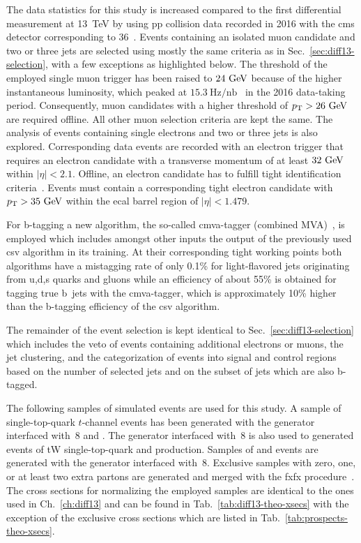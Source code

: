 The data statistics for this study is increased compared to the first differential measurement at 13~TeV by using \gls{pp} collision data recorded in 2016 with the \gls{cms} detector corresponding to 36~\invfb. Events containing an isolated muon candidate and two or three jets are selected using mostly the same criteria as in Sec.~\ref{sec:diff13-selection}, with a few exceptions as highlighted below. The threshold of the employed single muon trigger has been raised to $24~\textrm{GeV}$ because of the higher instantaneous luminosity, which peaked at $15.3~\mathrm{Hz}/\mathrm{nb}$~\cite{lumipublic} in the 2016 data-taking period. Consequently, muon candidates with a higher threshold of $p_\textrm{T}>26~\textrm{GeV}$ are required offline. All other muon selection criteria are kept the same. The analysis of events containing single electrons and two or three jets is also explored. Corresponding data events are recorded with an electron trigger that requires an electron candidate with a transverse momentum of at least $32~\textrm{GeV}$ within $|\eta|<2.1$. Offline, an electron candidate has to fulfill tight identification criteria~\cite{CMS-DP-2017-004}. Events must contain a corresponding tight electron candidate with $p_\textrm{T}>35~\textrm{GeV}$ within the \gls{ecal} barrel region of $|\eta|<1.479$.

For b-tagging a new algorithm, the so-called \gls{cmva}-tagger (combined MVA)~\cite{CMS-PAS-BTV-15-001}, is employed which includes amongst other inputs the output of the previously used \gls{csv} algorithm in its training. At their corresponding tight working points both algorithms have a mistagging rate of only 0.1\% for light-flavored jets originating from u,d,s quarks and gluons while an efficiency of about 55\% is obtained for tagging true b~jets with the \gls{cmva}-tagger, which is approximately 10\% higher than the b-tagging efficiency of the \gls{csv} algorithm. 

The remainder of the event selection is kept identical to Sec.~\ref{sec:diff13-selection} which includes the veto of events containing additional electrons or muons, the jet clustering, and the categorization of events into signal and control regions based on the number of selected jets and on the subset of jets which are also b-tagged.

The following samples of simulated events are used for this study. A sample of single-top-quark $t$-channel events has been generated with the \POWHEG generator interfaced with \PYTHIA{}\,8 and \MADSPIN. The \POWHEG generator interfaced with \PYTHIA{}\,8 is also used to generated events of tW single-top-quark and \ttbar production. Samples of \wjets and \zjets events are generated with the \MGAMC generator interfaced with \PYTHIA{}\,8. Exclusive \wjets samples with zero, one, or at least two extra partons are generated and merged with the \gls{fxfx} procedure~\cite{Frederix:2012ps}. The cross sections for normalizing the employed samples are identical to the ones used in Ch.~\ref{ch:diff13} and can be found in Tab.~\ref{tab:diff13-theo-xsecs} with the exception of the exclusive \wjets cross sections which are listed in Tab.~\ref{tab:prospects-theo-xsecs}.


